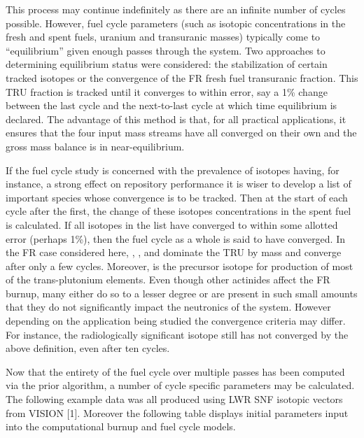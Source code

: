 This process may continue indefinitely as there are an infinite number of cycles possible.  However, 
fuel cycle parameters (such as isotopic concentrations in the fresh and spent fuels, uranium and 
transuranic masses) typically come to ``equilibrium'' given enough passes through the system.  
Two approaches to determining equilibrium status were considered: the stabilization of certain 
tracked isotopes or the convergence of the FR fresh fuel transuranic fraction.   This TRU fraction 
is tracked until it converges to within error, say a 1\% change between the last cycle and the 
next-to-last cycle at which time equilibrium is declared.    The advantage of this method is that, 
for all practical applications, it ensures that the four input mass streams have all converged on 
their own and the gross mass balance is in near-equilibrium.  

If the fuel cycle study is concerned with the prevalence of isotopes having, for instance, a strong 
effect on repository performance it is wiser to develop a list of important species whose convergence 
is to be tracked.  Then at the start of each cycle after the first, the change of these isotopes 
concentrations in the spent fuel is calculated.  If all isotopes in the list have converged to 
within some allotted error (perhaps 1\%), then the fuel cycle as a whole is said to have converged.   
In the FR case considered here, , , and  dominate the TRU by 
mass and converge after only a few cycles.    Moreover,  is the precursor isotope for 
production of most of the trans-plutonium elements.    Even though other actinides affect the FR 
burnup, many either do so to a lesser degree or are present in such small amounts that they do 
not significantly impact the neutronics of the system.  However depending on the application 
being studied the convergence criteria may differ.  For instance, the radiologically significant 
isotope  still has not converged by the above definition, even after ten cycles.

Now that the entirety of the fuel cycle over multiple passes has been computed via the prior 
algorithm, a number of cycle specific parameters may be calculated.  The following example data 
was all produced using LWR SNF isotopic vectors from VISION [1]. Moreover the following table 
displays initial parameters input into the computational burnup and fuel cycle models.

